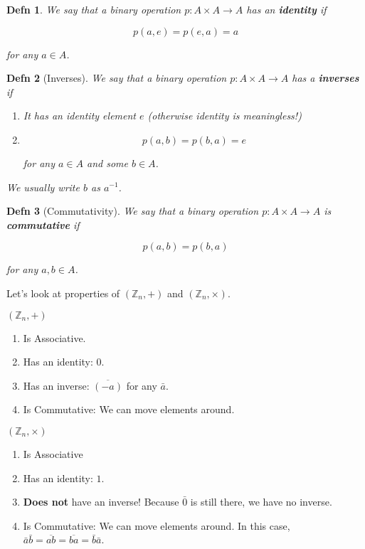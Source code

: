 \documentclass[12pt]{article}
\def\Z{{\mathbb Z}}
\newtheorem{definition}{Defn}
\theoremstyle{remark}
\theoremstyle{remark}
\theoremstyle{remark}
\theoremstyle{remark}
\theoremstyle{remark}
\begin{document}
\begin{definition}
	We say that a binary operation $p: A \times A \to A$ has an {\bf identity} if

	\[
		p(a, e) = p(e, a) = a
	\]

	for any $a \in A$.
\end{definition}

\begin{definition}[Inverses]
	We say that a binary operation $p: A \times A \to A$ has a {\bf inverses} if

	\begin{enumerate}
		\item It has an identity element $e$ (otherwise identity is meaningless!)

		\item
		      \[
			      p(a, b) = p(b, a) = e
		      \]

		      for any $a \in A$ and some $b \in A$.
	\end{enumerate}

	We usually write $b$ as $a^{-1}$.
\end{definition}

\begin{definition}[Commutativity]
	We say that a binary operation $p: A \times A \to A$ is {\bf commutative} if

	\[
		p(a, b) = p(b, a)
	\]

	for any $a, b \in A$.
\end{definition}

Let's look at properties of $(\Z_n, +)$ and $(\Z_n, \times)$.

$(\Z_n, +)$

\begin{enumerate}
	\item Is Associative.
	\item Has an identity: $0$.
	\item Has an inverse: $\overline{(-a)}$ for any $\bar a$.
	\item Is Commutative: We can move elements around.
\end{enumerate}

$(\Z_n, \times)$

\begin{enumerate}
	\item Is Associative
	\item Has an identity: $1$.
	\item {\bf Does not} have an inverse! Because $\bar 0$ is still there, we
	      have no inverse.
	\item Is Commutative: We can move elements around. In this case, $\bar a
		      \bar b = \overline{ab} = \overline{ba} = \bar b \bar a$.
\end{enumerate}
\end{document}
